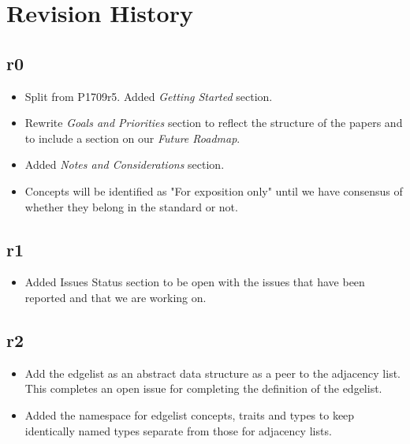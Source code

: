 \section{Revision History}

\subsection*{\paperno r0}

\begin{itemize}
      \item Split from P1709r5. Added \textit{Getting Started} section.
      \item Rewrite \textit{Goals and Priorities} section to reflect the structure of the papers and to include a section on our \textit{Future Roadmap}.
      \item Added \textit{Notes and Considerations} section.
      \item Concepts will be identified as "For exposition only" until we have consensus of whether they belong in the standard or not.
\end{itemize}

\subsection*{\paperno r1}
\begin{itemize}
      \item {Added Issues Status section to be open with the issues that have been reported and that we are working on.}
\end{itemize}

\subsection*{\paperno r2}
\begin{itemize}
      \item Add the edgelist as an abstract data structure as a peer to the adjacency list. 
            This completes an open issue for completing the definition of the edgelist.
      \item Added the  namespace for edgelist concepts, traits and types
            to keep identically named types separate from those for adjacency lists.
\end{itemize}
